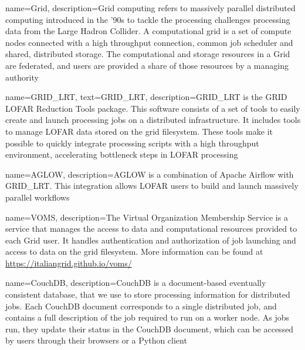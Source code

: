 {   
    name={Grid},
    description={Grid computing refers to massively parallel distributed computing introduced in the '90s to tackle the processing challenges processing data from the Large Hadron Collider. A computational grid is a set of compute nodes connected with a high throughput connection, common job scheduler and shared, distributed storage. The computational and storage resources in a Grid are federated, and users are provided a share of those resources by a managing authority }
}

{
    name={GRID\_LRT},
    text={GRID\_LRT},
    description={GRID\_LRT is the GRID LOFAR Reduction Tools package. This software consists of a set of tools to easily create and launch processing jobs on a distributed infrastructure. It includes tools to manage LOFAR data stored on the grid filesystem. These tools make it possible to quickly integrate processing scripts with a high throughput environment, accelerating bottleneck steps in LOFAR processing }
}


{
    name={AGLOW},
    description={AGLOW is a combination of Apache Airflow with GRID\_LRT. This integration allows LOFAR users to build and launch massively parallel workflows
}}


{
    name=VOMS,
    description={The Virtual Organization Membership Service is a service that manages the access to data and computational resources provided to each Grid user. It handles authentication and authorization of job launching and access to data on the grid filesystem. More information can be found at \url{https://italiangrid.github.io/voms/} }
}

{
    name=CouchDB, 
    description={CouchDB is a document-based eventually consistent database, that we use to store processing information for distributed jobs. Each CouchDB document corresponds to a single distributed job, and contains a full description of the job required to run on a worker node. As jobs run, they update their status in the CouchDB document, which can be accessed by users through their browsers or a Python client}
}

